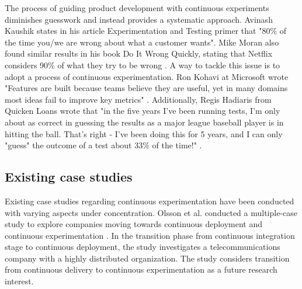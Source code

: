 \documentclass[english]{tktltiki2}
\theoremstyle{definition}
\theoremstyle{remark}
\begin{document}
The process of guiding product development with continuous experiments diminishes guesswork and instead provides a systematic approach. Avinash Kaushik states in his article Experimentation and Testing primer \cite{kaushik} that "80\% of the time you/we are wrong about what a customer wants". Mike Moran also found similar results in his book Do It Wrong Quickly, stating that Netflix considers 90\% of what they try to be wrong \cite{moran2007wrong}. A way to tackle this issue is to adopt a process of continuous experimentation. Ron Kohavi at Microsoft wrote "Features are built because teams believe they are useful, yet in many domains most ideas fail to improve key metrics" \cite{kohavi2013online}. Additionally, Regis Hadiaris from Quicken Loans wrote that "in the five years I've been running tests, I'm only about as correct in guessing the results as a major league baseball player is in hitting the ball. That's right - I've been doing this for 5 years, and I can only "guess" the outcome of a test about 33\% of the time!" \cite{moranmultivariate}.


\subsection{Existing case studies}


Existing case studies regarding continuous experimentation have been conducted with varying aspects under concentration. Olsson et al. conducted a multiple-case study to explore companies moving towards continuous deployment and continuous experimentation \cite{olsson2012climbing}. In the transition phase from continuous integration stage to continuous deployment, the study investigates a telecommunications company with a highly distributed organization. The study considers transition from continuous delivery to continuous experimentation as a future research interest. 
\end{document}
